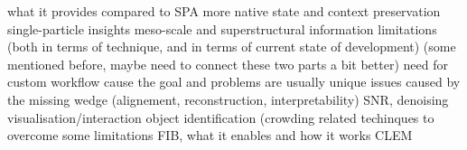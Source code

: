 \begin{outline}
    \2 what it provides compared to SPA
        \3 more native state and context preservation
        \3 single-particle insights
        \3 meso-scale and superstructural information
    \2 limitations (both in terms of technique, and in terms of current state of development)
        \3 (some mentioned before, maybe need to connect these two parts a bit better)
        \3 need for custom workflow cause the goal and problems are usually unique
        \3 issues caused by the missing wedge (alignement, reconstruction, interpretability)
        \3 SNR, denoising
        \3 visualisation/interaction
        \3 object identification (crowding
    \2 related techinques to overcome some limitations
        \3 FIB, what it enables and how it works
        \2 CLEM
\end{outline}
